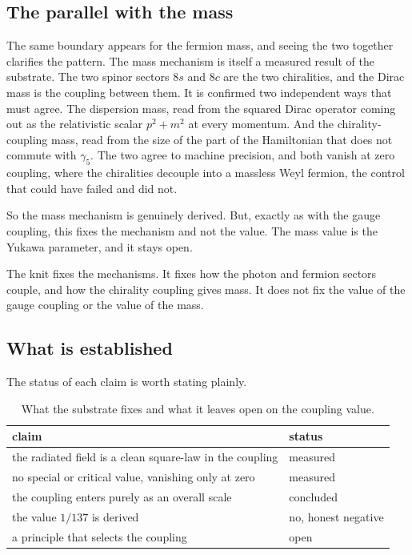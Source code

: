 \subsection{The parallel with the mass}

The same boundary appears for the fermion mass, and seeing the two together clarifies the pattern. The mass mechanism is itself a measured result of the substrate. The two spinor sectors $8s$ and $8c$ are the two chiralities, and the Dirac mass is the coupling between them. It is confirmed two independent ways that must agree. The dispersion mass, read from the squared Dirac operator coming out as the relativistic scalar $p^2 + m^2$ at every momentum. And the chirality-coupling mass, read from the size of the part of the Hamiltonian that does not commute with $\gamma_5$. The two agree to machine precision, and both vanish at zero coupling, where the chiralities decouple into a massless Weyl fermion, the control that could have failed and did not.

So the mass mechanism is genuinely derived. But, exactly as with the gauge coupling, this fixes the mechanism and not the value. The mass value is the Yukawa parameter, and it stays open.

\begin{principle}
The knit fixes the mechanisms. It fixes how the photon and fermion sectors couple, and how the chirality coupling gives mass. It does not fix the value of the gauge coupling or the value of the mass.
\end{principle}

\subsection{What is established}

The status of each claim is worth stating plainly.

\begin{table}[ht]
\centering
\begin{tabular}{@{}ll@{}}
\toprule
claim & status \\
\midrule
the radiated field is a clean square-law in the coupling & measured \\
no special or critical value, vanishing only at zero & measured \\
the coupling enters purely as an overall scale & concluded \\
the value $1/137$ is derived & no, honest negative \\
a principle that selects the coupling & open \\
\bottomrule
\end{tabular}
\caption{What the substrate fixes and what it leaves open on the coupling value.}
\label{tab:coupling-status}
\end{table}

